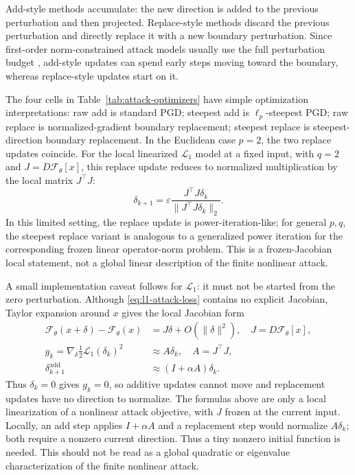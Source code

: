 \documentclass[letterpaper]{article} %
\newcommand{\tabref}[1]{Table~\ref{#1}}
\begin{document}
Add-style methods accumulate: the new direction is added to the previous
perturbation and then projected. Replace-style methods discard the previous
perturbation and directly replace it with a new boundary perturbation. Since
first-order norm-constrained attack models usually use the full perturbation
budget
\citep{goodfellow2015explaining,kurakin2016physical,madry2018towards}, add-style
updates can spend early steps moving toward the boundary, whereas replace-style
updates start on it.

The four cells in \tabref{tab:attack-optimizers} have simple optimization
interpretations: raw add is standard PGD; steepest add is $\ell_p$-steepest PGD;
raw replace is normalized-gradient boundary replacement; steepest replace is
steepest-direction boundary replacement. In the Euclidean case $p=2$, the two
replace updates coincide. For the local linearized $\mathcal{L}_1$ model at a
fixed input, with $q=2$ and $J=D\mathcal{F}_\theta[x]$, this replace update
reduces to normalized multiplication by the local matrix $J^\top J$:
\begin{equation}
  \delta_{k+1}
  =
  \varepsilon
  \frac{J^\top J\delta_k}{\|J^\top J\delta_k\|_2}.
\end{equation}
In this limited setting, the replace update is power-iteration-like; for
general \(p,q\), the steepest replace variant is analogous to a generalized
power iteration for the corresponding frozen linear operator-norm problem.
This is a frozen-Jacobian local statement, not a global linear description of
the finite nonlinear attack.

A small implementation caveat follows for $\mathcal{L}_1$: it must not be
started from the zero perturbation. Although \eqref{eq:l1-attack-loss} contains
no explicit Jacobian, Taylor expansion around $x$ gives the local Jacobian form
\begin{align*}
  \mathcal{F}_\theta(x+\delta)-\mathcal{F}_\theta(x)
  &= J\delta+O(\|\delta\|^2),\quad J=D\mathcal{F}_\theta[x],\\
  g_k=\nabla_\delta\tfrac{1}{2}\mathcal{L}_1(\delta_k)^2
  &\approx A\delta_k,\quad A=J^\top J,\\
  \delta_{k+1}^{\mathrm{add}}
  &\approx (I+\alpha A)\delta_k .
\end{align*}
Thus $\delta_k=0$ gives $g_k=0$, so additive updates cannot move and replacement
updates have no direction to normalize. The formulas above are only a local
linearization of a nonlinear attack objective, with $J$ frozen at the current
input. Locally, an add step applies $I+\alpha A$ and a replacement step would
normalize $A\delta_k$; both require a nonzero current direction. Thus a tiny
nonzero initial function is needed. This should not be read as a global
quadratic or eigenvalue characterization of the finite nonlinear attack.
\end{document}
